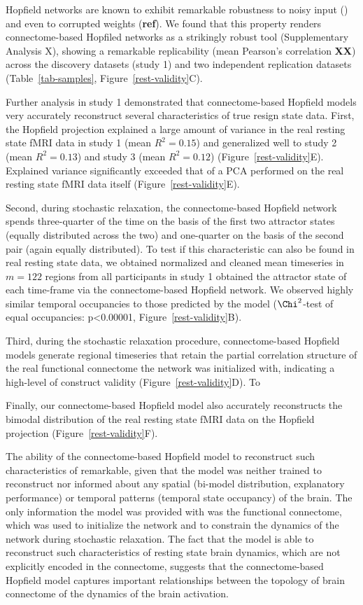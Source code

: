 \documentclass{article}
\begin{document}
Hopfield networks are known to exhibit remarkable robustness to noisy input (\href{https://doi.org/10.1073/pnas.79.8.2554}{}) and even to corrupted weights (\textbf{ref}). We found that this property renders connectome-based Hopfiled networks as a strikingly robust tool (Supplementary Analysis X), showing a remarkable replicability (mean Pearson's correlation \textbf{XX}) across the discovery datasets (study 1) and two independent replication datasets (Table~\ref{tab-samples}, Figure~\ref{rest-validity}C).

Further analysis in study 1 demonstrated that connectome-based Hopfield models very accurately reconstruct several characteristics of true resign state data.
First, the Hopfield projection explained a large amount of variance in the real resting state fMRI data in study 1 (mean $R^2=0.15$) and generalized well to study 2 (mean $R^2=0.13$) and study 3 (mean $R^2=0.12$) (Figure~\ref{rest-validity}E). Explained variance significantly exceeded that of a PCA performed on the real resting state fMRI data itself (Figure~\ref{rest-validity}E).

Second, during stochastic relaxation, the connectome-based Hopfield network spends three-quarter of the time on the basis of the first two attractor states (equally distributed across the two) and one-quarter on the basis of the second pair (again equally distributed). To test if this characteristic can also be found in real resting state data, we obtained normalized and cleaned mean timeseries in $m=122$ regions from all participants in study 1 obtained the attractor state of each time-frame via the connectome-based Hopfield network. We observed highly similar temporal occupancies to those predicted by the model ($\Chi^2$-test of equal occupancies: p\textless 0.00001, Figure~\ref{rest-validity}B).

Third, during the stochastic relaxation procedure, connectome-based Hopfield models generate regional timeseries that retain the partial correlation structure of the real functional connectome the network was initialized with, indicating a high-level of construct validity (Figure~\ref{rest-validity}D). To

Finally, our connectome-based Hopfield model also accurately reconstructs the bimodal distribution of the real resting state fMRI data on the Hopfield projection (Figure~\ref{rest-validity}F).

The ability of the connectome-based Hopfield model to reconstruct such characteristics of remarkable, given that the model was neither trained to reconstruct nor informed about any spatial (bi-model distribution, explanatory performance) or temporal patterns (temporal state occupancy) of the brain. The only information the model was provided with was the functional connectome, which was used to initialize the network and to constrain the dynamics of the network during stochastic relaxation. The fact that the model is able to reconstruct such characteristics of resting state brain dynamics, which are not explicitly encoded in the connectome, suggests that the connectome-based Hopfield model captures important relationships between the topology of brain connectome of the dynamics of the brain activation.
\end{document}
